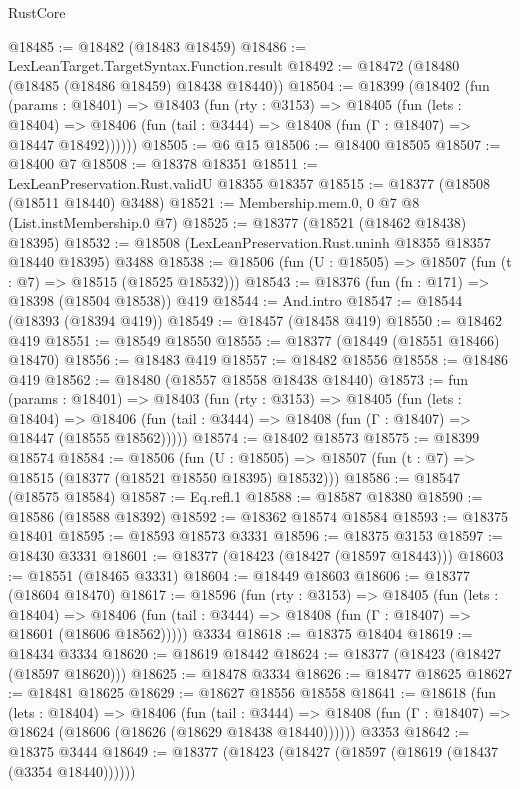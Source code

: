 \begin{lexlean}{RustCore}
\begin{coremodule}
@18485 := @18482 (@18483 @18459)
@18486 := LexLeanTarget.TargetSyntax.Function.result
@18492 := @18472 (@18480 (@18485 (@18486 @18459) @18438 @18440))
@18504 := @18399
    (@18402
      (fun (params : @18401) =>
      @18403
        (fun (rty : @3153) =>
        @18405
          (fun (lets : @18404) =>
          @18406 (fun (tail : @3444) => @18408 (fun (Γ : @18407) => @18447 @18492))))))
@18505 := @6 @15
@18506 := @18400 @18505
@18507 := @18400 @7
@18508 := @18378 @18351
@18511 := LexLeanPreservation.Rust.validU @18355 @18357
@18515 := @18377 (@18508 (@18511 @18440) @3488)
@18521 := Membership.mem.{0, 0} @7 @8 (List.instMembership.{0} @7)
@18525 := @18377 (@18521 (@18462 @18438) @18395)
@18532 := @18508 (LexLeanPreservation.Rust.uninh @18355 @18357 @18440 @18395) @3488
@18538 := @18506 (fun (U : @18505) => @18507 (fun (t : @7) => @18515 (@18525 @18532)))
@18543 := @18376 (fun (fn : @171) => @18398 (@18504 @18538)) @419
@18544 := And.intro
@18547 := @18544 (@18393 (@18394 @419))
@18549 := @18457 (@18458 @419)
@18550 := @18462 @419
@18551 := @18549 @18550
@18555 := @18377 (@18449 (@18551 @18466) @18470)
@18556 := @18483 @419
@18557 := @18482 @18556
@18558 := @18486 @419
@18562 := @18480 (@18557 @18558 @18438 @18440)
@18573 := fun (params : @18401) =>
  @18403
    (fun (rty : @3153) =>
    @18405
      (fun (lets : @18404) =>
      @18406 (fun (tail : @3444) => @18408 (fun (Γ : @18407) => @18447 (@18555 @18562)))))
@18574 := @18402 @18573
@18575 := @18399 @18574
@18584 := @18506
    (fun (U : @18505) => @18507 (fun (t : @7) => @18515 (@18377 (@18521 @18550 @18395) @18532)))
@18586 := @18547 (@18575 @18584)
@18587 := Eq.refl.{1}
@18588 := @18587 @18380
@18590 := @18586 (@18588 @18392)
@18592 := @18362 @18574 @18584
@18593 := @18375 @18401
@18595 := @18593 @18573 @3331
@18596 := @18375 @3153
@18597 := @18430 @3331
@18601 := @18377 (@18423 (@18427 (@18597 @18443)))
@18603 := @18551 (@18465 @3331)
@18604 := @18449 @18603
@18606 := @18377 (@18604 @18470)
@18617 := @18596
    (fun (rty : @3153) =>
    @18405
      (fun (lets : @18404) =>
      @18406 (fun (tail : @3444) => @18408 (fun (Γ : @18407) => @18601 (@18606 @18562)))))
    @3334
@18618 := @18375 @18404
@18619 := @18434 @3334
@18620 := @18619 @18442
@18624 := @18377 (@18423 (@18427 (@18597 @18620)))
@18625 := @18478 @3334
@18626 := @18477 @18625
@18627 := @18481 @18625
@18629 := @18627 @18556 @18558
@18641 := @18618
    (fun (lets : @18404) =>
    @18406
      (fun (tail : @3444) =>
      @18408 (fun (Γ : @18407) => @18624 (@18606 (@18626 (@18629 @18438 @18440))))))
    @3353
@18642 := @18375 @3444
@18649 := @18377 (@18423 (@18427 (@18597 (@18619 (@18437 (@3354 @18440))))))

\end{coremodule}
\end{lexlean}
